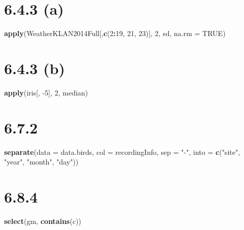 \documentclass[
]{krantz}
\newenvironment{Shaded}{\begin{snugshade}}{\end{snugshade}}
\newcommand{\DataTypeTok}[1]{\textcolor[rgb]{0.13,0.29,0.53}{#1}}
\newcommand{\DecValTok}[1]{\textcolor[rgb]{0.00,0.00,0.81}{#1}}
\newcommand{\KeywordTok}[1]{\textcolor[rgb]{0.13,0.29,0.53}{\textbf{#1}}}
\newcommand{\NormalTok}[1]{#1}
\newcommand{\OperatorTok}[1]{\textcolor[rgb]{0.81,0.36,0.00}{\textbf{#1}}}
\newcommand{\OtherTok}[1]{\textcolor[rgb]{0.56,0.35,0.01}{#1}}
\newcommand{\StringTok}[1]{\textcolor[rgb]{0.31,0.60,0.02}{#1}}
\begin{document}
\hypertarget{a}{%
\section*{6.4.3 (a)}\label{a}}


\begin{Shaded}
\begin{Highlighting}[]
\KeywordTok{apply}\NormalTok{(WeatherKLAN2014Full[,}\KeywordTok{c}\NormalTok{(}\DecValTok{2}\OperatorTok{:}\DecValTok{19}\NormalTok{, }\DecValTok{21}\NormalTok{, }\DecValTok{23}\NormalTok{)], }\DecValTok{2}\NormalTok{, sd, }\DataTypeTok{na.rm =} \OtherTok{TRUE}\NormalTok{)}
\end{Highlighting}
\end{Shaded}

\hypertarget{b}{%
\section*{6.4.3 (b)}\label{b}}


\begin{Shaded}
\begin{Highlighting}[]
\KeywordTok{apply}\NormalTok{(iris[, }\DecValTok{{-}5}\NormalTok{], }\DecValTok{2}\NormalTok{, median)}
\end{Highlighting}
\end{Shaded}

\hypertarget{section-5}{%
\section*{6.7.2}\label{section-5}}


\begin{Shaded}
\begin{Highlighting}[]
\KeywordTok{separate}\NormalTok{(}\DataTypeTok{data =}\NormalTok{ data.birds, }\DataTypeTok{col =}\NormalTok{ recordingInfo, }\DataTypeTok{sep =} \StringTok{"{-}"}\NormalTok{,}
     \DataTypeTok{into =} \KeywordTok{c}\NormalTok{(}\StringTok{"site"}\NormalTok{, }\StringTok{"year"}\NormalTok{, }\StringTok{"month"}\NormalTok{, }\StringTok{"day"}\NormalTok{))}
\end{Highlighting}
\end{Shaded}

\hypertarget{section-6}{%
\section*{6.8.4}\label{section-6}}


\begin{Shaded}
\begin{Highlighting}[]
\KeywordTok{select}\NormalTok{(gm, }\KeywordTok{contains}\NormalTok{(}\StringTok{\textquotesingle{}c\textquotesingle{}}\NormalTok{))}
\end{Highlighting}
\end{Shaded}
\end{document}
